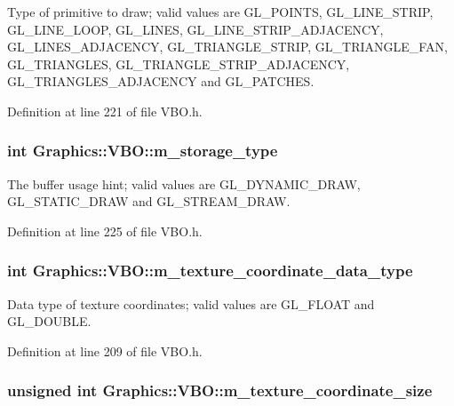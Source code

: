 Type of primitive to draw; valid values are GL\_\-POINTS, GL\_\-LINE\_\-STRIP, GL\_\-LINE\_\-LOOP, GL\_\-LINES, GL\_\-LINE\_\-STRIP\_\-ADJACENCY, GL\_\-LINES\_\-ADJACENCY, GL\_\-TRIANGLE\_\-STRIP, GL\_\-TRIANGLE\_\-FAN, GL\_\-TRIANGLES, GL\_\-TRIANGLE\_\-STRIP\_\-ADJACENCY, GL\_\-TRIANGLES\_\-ADJACENCY and GL\_\-PATCHES. 



Definition at line 221 of file VBO.h.

\hypertarget{class_graphics_1_1_v_b_o_a5f534f57456b712463a2c7cf7cf4f249}{
\subsubsection[{m\_\-storage\_\-type}]{\setlength{\rightskip}{0pt plus 5cm}int {\bf Graphics::VBO::m\_\-storage\_\-type}}}
\label{class_graphics_1_1_v_b_o_a5f534f57456b712463a2c7cf7cf4f249}


The buffer usage hint; valid values are GL\_\-DYNAMIC\_\-DRAW, GL\_\-STATIC\_\-DRAW and GL\_\-STREAM\_\-DRAW. 



Definition at line 225 of file VBO.h.

\hypertarget{class_graphics_1_1_v_b_o_a450479bb177f1b603baab9e809f8a3fe}{
\subsubsection[{m\_\-texture\_\-coordinate\_\-data\_\-type}]{\setlength{\rightskip}{0pt plus 5cm}int {\bf Graphics::VBO::m\_\-texture\_\-coordinate\_\-data\_\-type}}}
\label{class_graphics_1_1_v_b_o_a450479bb177f1b603baab9e809f8a3fe}


Data type of texture coordinates; valid values are GL\_\-FLOAT and GL\_\-DOUBLE. 



Definition at line 209 of file VBO.h.

\hypertarget{class_graphics_1_1_v_b_o_ad764a9816e96edc1ed1659bcd64e9796}{
\subsubsection[{m\_\-texture\_\-coordinate\_\-size}]{\setlength{\rightskip}{0pt plus 5cm}unsigned int {\bf Graphics::VBO::m\_\-texture\_\-coordinate\_\-size}}}
\label{class_graphics_1_1_v_b_o_ad764a9816e96edc1ed1659bcd64e9796}


